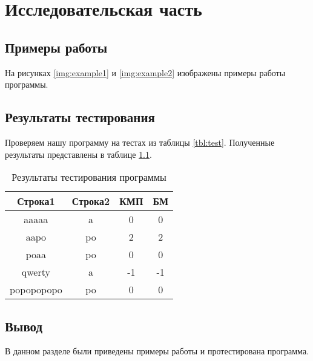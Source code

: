 \chapter{Исследовательская часть}

\section{Примеры работы}

На рисунках \ref{img:example1} и \ref{img:example2} изображены примеры работы программы.



\section{Результаты тестирования}

Проверяем нашу программу на тестах из таблицы \ref{tbl:test}. Полученные результаты представлены в таблице \ref{tbl:test-results}.

\begin{table}[h!]
	\begin{center}
		\begin{tabular}{|c|c|c|c|}
			\hline
			\textbf{Строка1} & \textbf{Строка2} & \textbf{КМП} & \textbf{БМ}  \\ \hline
			aaaaa      & a  & 0  & 0  \\ \hline
			aapo       & po & 2  & 2  \\ \hline
			poaa       & po & 0  & 0  \\ \hline
			qwerty     & a  & -1 & -1 \\ \hline
			popopopopo & po & 0  & 0  \\ \hline
		\end{tabular}
	\end{center}
	\caption{Результаты тестирования программы}
	\label{tbl:test-results}
\end{table}

\section*{Вывод}

В данном разделе были приведены примеры работы и протестирована программа.
